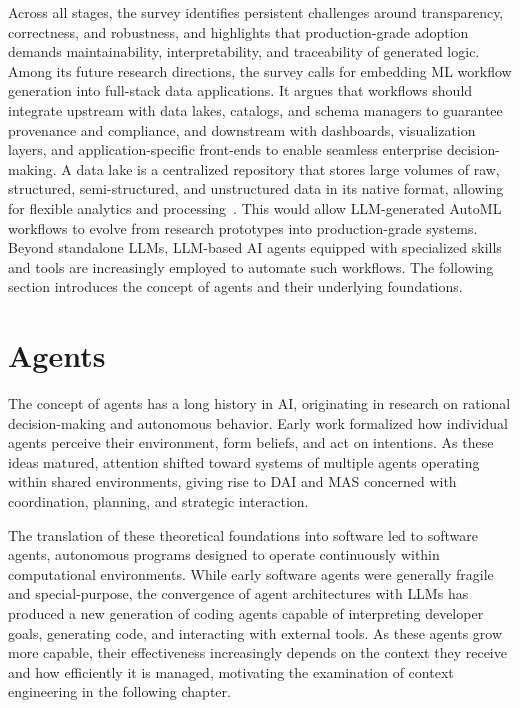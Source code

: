 \documentclass[
english,                 %
bibtex,                  %
includeExtraAbstracts, %
]{kththesis}
\numberwithin{listing}{chapter}
\begin{document}
Across all stages, the survey identifies persistent challenges around transparency, correctness, and robustness, and highlights that production-grade adoption demands maintainability, interpretability, and traceability of generated logic. Among its future research directions, the survey calls for embedding \gls{ML} workflow generation into full-stack data applications. It argues that workflows should integrate upstream with data lakes, catalogs, and schema managers to guarantee provenance and compliance, and downstream with dashboards, visualization layers, and application-specific front-ends to enable seamless enterprise decision-making. A data lake is a centralized repository that stores large volumes of raw, structured, semi-structured, and unstructured data in its native format, allowing for flexible analytics and processing~\cite{hai_data_2023}. This would allow \gls{LLM}-generated \gls{AutoML} workflows to evolve from research prototypes into production-grade systems. Beyond standalone \glspl{LLM}, \gls{LLM}-based \gls{AI} agents equipped with specialized skills and tools are increasingly employed to automate such workflows. The following section introduces the concept of agents and their underlying foundations.

\section{Agents}
\glsresetall

The concept of agents has a long history in \gls{AI}, originating in research on rational decision-making and autonomous behavior. Early work formalized how individual agents perceive their environment, form beliefs, and act on intentions. As these ideas matured, attention shifted toward systems of multiple agents operating within shared environments, giving rise to \gls{DAI} and \gls{MAS} concerned with coordination, planning, and strategic interaction.

The translation of these theoretical foundations into software led to software agents, autonomous programs designed to operate continuously within computational environments. While early software agents were generally fragile and special-purpose, the convergence of agent architectures with \glspl{LLM} has produced a new generation of coding agents capable of interpreting developer goals, generating code, and interacting with external tools. As these agents grow more capable, their effectiveness increasingly depends on the context they receive and how efficiently it is managed, motivating the examination of context engineering in the following chapter.
\end{document}

